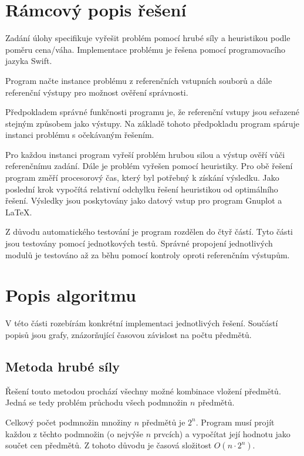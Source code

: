 \documentclass{article}
\begin{document}
\section{Rámcový popis řešení}

Zadání úlohy specifikuje vyřešit problém pomocí hrubé síly a heuristikou podle poměru cena/váha.
Implementace problému je řešena pomocí programovacího jazyka Swift.

Program načte instance problému z referenčních vstupních souborů a dále referenční výstupy pro možnost ověření správnosti.

Předpokladem správné funkčnosti programu je, že referenční vstupy jsou seřazené stejným způsobem jako výstupy.
Na základě tohoto předpokladu program spáruje instanci problému s očekávaným řešením.

Pro každou instanci program vyřeší problém hrubou silou a výstup ověří vůči referenčnímu zadání.
Dále je problém vyřešen pomocí heuristiky.
Pro obě řešení program změří procesorový čas, který byl potřebný k získání výsledku.
Jako poslední krok vypočítá relativní odchylku řešení heuristikou od optimálního řešení.
Výsledky jsou poskytovány jako datový vstup pro program Gnuplot a \LaTeX{}.

Z důvodu automatického testování je program rozdělen do čtyř částí.
Tyto části jsou testovány pomocí jednotkových testů.
Správné propojení jednotlivých modulů je testováno až za běhu pomocí kontroly oproti referenčním výstupům.

\section{Popis algoritmu}

V této části rozebírám konkrétní implementaci jednotlivých řešení.
Součástí popisů jsou grafy, znázorňující časovou závislost na počtu předmětů.

\subsection*{Metoda hrubé síly}

Řešení touto metodou prochází všechny možné kombinace vložení předmětů.
Jedná se tedy problém průchodu všech podmnožin $n$ předmětů.

Celkový počet podmnožin množiny $n$ předmětů je $2^n$.
Program musí projít každou z těchto podmnožin (o nejvýše $n$ prvcích) a vypočítat její hodnotu jako součet cen předmětů.
Z tohoto důvodu je časová složitost $O(n \cdot 2^n)$.
\end{document}
